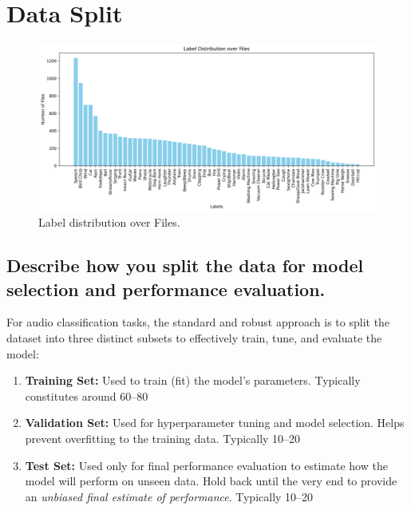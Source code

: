 
\section{Data Split} 
\label{sec:Data Split}


\begin{figure}[htbp]
  \centering
  \includegraphics[width=1.0\textwidth]{figs/2_Label Distribution over Files.png}
  \caption{Label distribution over Files.}
  \label{fig:data-split}
\end{figure}



\subsection{Describe how you split the data for model selection and performance evaluation. }
\label{sec:Data Split:a}

For audio classification tasks, the standard and robust approach is to split the dataset into three distinct subsets to effectively train, tune, and evaluate the model:


\begin{enumerate}
	\item {\bf Training Set: } Used to train (fit) the model's parameters. Typically constitutes around 60–80%
	
	\item {\bf Validation Set: } Used for hyperparameter tuning and model selection. Helps prevent overfitting to the training data. Typically 10–20%

	\item {\bf Test Set: } Used only for final performance evaluation to estimate how the model will perform on unseen data. Hold back until the very end to provide an {\it unbiased final estimate of performance}. Typically 10–20%
\end{enumerate}


